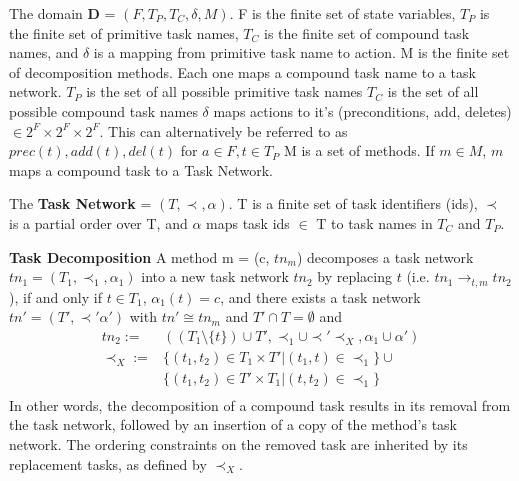 The domain \textbf{D} = $(F, T_P, T_C, \delta, M)$.
F is the finite set of state variables, $T_P$ is the finite set of primitive task names, $T_C$ is the finite set of compound task names, and
$\delta$ is a mapping from primitive task name to action.
M is the finite set of decomposition methods. Each one maps a compound task name to a task network.
 $T_P$ is the set of all possible primitive task names
 $T_C$ is the set of all possible compound task names
$\delta$ maps actions to it's (preconditions, add, deletes) $\in 2^F \times 2^F \times 2^F$. This can alternatively be referred to as $prec(t), add(t), del(t)$ for $a \in F, t \in T_P$
 M is a set of methods. If $m \in M$, $m$ maps a compound task to a Task Network.

The \textbf{Task Network} = $(T, \prec, \alpha)$.
 T is a finite set of task identifiers (ids),
 $\prec$ is a partial order over T, and
 $\alpha$ maps task ids $\in$ T to task names in $T_C$ and $T_P$.
 
\textbf{Task Decomposition}
A method m = (c, $tn_m$) decomposes a task network $tn_1 = (T_1, \prec_1, \alpha_1)$ into
a new task network $tn_2$ by replacing $t$ (i.e. $tn_1 \rightarrow_{t,m} tn_2$), if and only if $t \in T_1$, $\alpha_1(t) = c$, and there exists a task network $tn' = (T', \prec' \alpha')$ with $tn' \cong tn_m$ and $T' \cap T = \emptyset$ and
\begin{align}
tn_2 :=     &((T_1 \setminus \{t\}) \cup T',    \prec_1 \cup \prec' \prec_X,        \alpha_1 \cup \alpha') \\
\prec_X :=  &\{(t_1, t_2) \in T_1 \times T'  \vert  (t_1,t) \in \prec_1 \} \cup \\
            &\{(t_1, t_2) \in T' \times T_1 \vert (t, t_2) \in \prec_1 \}  \\
\end{align}
In other words, the decomposition of a compound task results in its removal from the task network, followed by an insertion of a copy of the method’s task network. The ordering constraints
on the removed task are inherited by its replacement tasks, as defined by $\prec_X$.

